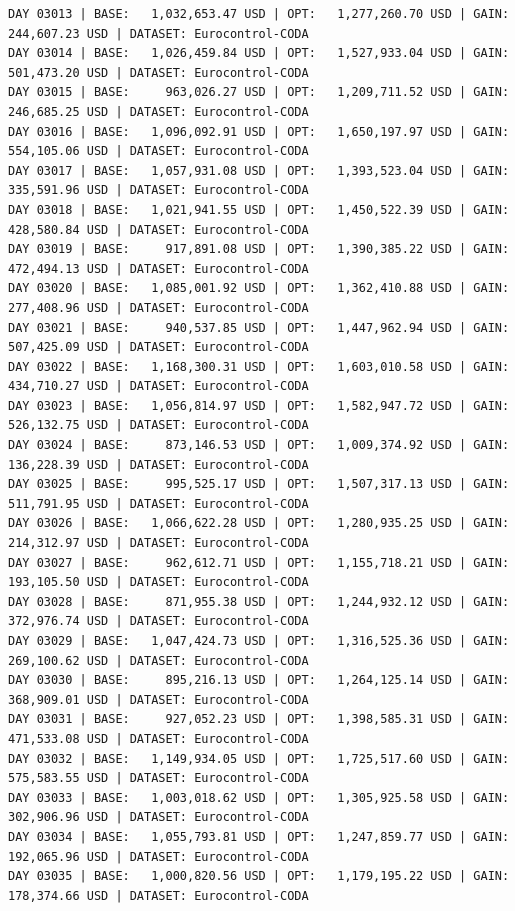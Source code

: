 \documentclass[11pt,a4paper]{article}
\begin{document}
\begin{verbatim}
DAY 03013 | BASE:   1,032,653.47 USD | OPT:   1,277,260.70 USD | GAIN: 244,607.23 USD | DATASET: Eurocontrol-CODA
DAY 03014 | BASE:   1,026,459.84 USD | OPT:   1,527,933.04 USD | GAIN: 501,473.20 USD | DATASET: Eurocontrol-CODA
DAY 03015 | BASE:     963,026.27 USD | OPT:   1,209,711.52 USD | GAIN: 246,685.25 USD | DATASET: Eurocontrol-CODA
DAY 03016 | BASE:   1,096,092.91 USD | OPT:   1,650,197.97 USD | GAIN: 554,105.06 USD | DATASET: Eurocontrol-CODA
DAY 03017 | BASE:   1,057,931.08 USD | OPT:   1,393,523.04 USD | GAIN: 335,591.96 USD | DATASET: Eurocontrol-CODA
DAY 03018 | BASE:   1,021,941.55 USD | OPT:   1,450,522.39 USD | GAIN: 428,580.84 USD | DATASET: Eurocontrol-CODA
DAY 03019 | BASE:     917,891.08 USD | OPT:   1,390,385.22 USD | GAIN: 472,494.13 USD | DATASET: Eurocontrol-CODA
DAY 03020 | BASE:   1,085,001.92 USD | OPT:   1,362,410.88 USD | GAIN: 277,408.96 USD | DATASET: Eurocontrol-CODA
DAY 03021 | BASE:     940,537.85 USD | OPT:   1,447,962.94 USD | GAIN: 507,425.09 USD | DATASET: Eurocontrol-CODA
DAY 03022 | BASE:   1,168,300.31 USD | OPT:   1,603,010.58 USD | GAIN: 434,710.27 USD | DATASET: Eurocontrol-CODA
DAY 03023 | BASE:   1,056,814.97 USD | OPT:   1,582,947.72 USD | GAIN: 526,132.75 USD | DATASET: Eurocontrol-CODA
DAY 03024 | BASE:     873,146.53 USD | OPT:   1,009,374.92 USD | GAIN: 136,228.39 USD | DATASET: Eurocontrol-CODA
DAY 03025 | BASE:     995,525.17 USD | OPT:   1,507,317.13 USD | GAIN: 511,791.95 USD | DATASET: Eurocontrol-CODA
DAY 03026 | BASE:   1,066,622.28 USD | OPT:   1,280,935.25 USD | GAIN: 214,312.97 USD | DATASET: Eurocontrol-CODA
DAY 03027 | BASE:     962,612.71 USD | OPT:   1,155,718.21 USD | GAIN: 193,105.50 USD | DATASET: Eurocontrol-CODA
DAY 03028 | BASE:     871,955.38 USD | OPT:   1,244,932.12 USD | GAIN: 372,976.74 USD | DATASET: Eurocontrol-CODA
DAY 03029 | BASE:   1,047,424.73 USD | OPT:   1,316,525.36 USD | GAIN: 269,100.62 USD | DATASET: Eurocontrol-CODA
DAY 03030 | BASE:     895,216.13 USD | OPT:   1,264,125.14 USD | GAIN: 368,909.01 USD | DATASET: Eurocontrol-CODA
DAY 03031 | BASE:     927,052.23 USD | OPT:   1,398,585.31 USD | GAIN: 471,533.08 USD | DATASET: Eurocontrol-CODA
DAY 03032 | BASE:   1,149,934.05 USD | OPT:   1,725,517.60 USD | GAIN: 575,583.55 USD | DATASET: Eurocontrol-CODA
DAY 03033 | BASE:   1,003,018.62 USD | OPT:   1,305,925.58 USD | GAIN: 302,906.96 USD | DATASET: Eurocontrol-CODA
DAY 03034 | BASE:   1,055,793.81 USD | OPT:   1,247,859.77 USD | GAIN: 192,065.96 USD | DATASET: Eurocontrol-CODA
DAY 03035 | BASE:   1,000,820.56 USD | OPT:   1,179,195.22 USD | GAIN: 178,374.66 USD | DATASET: Eurocontrol-CODA

\end{verbatim}
\end{document}
